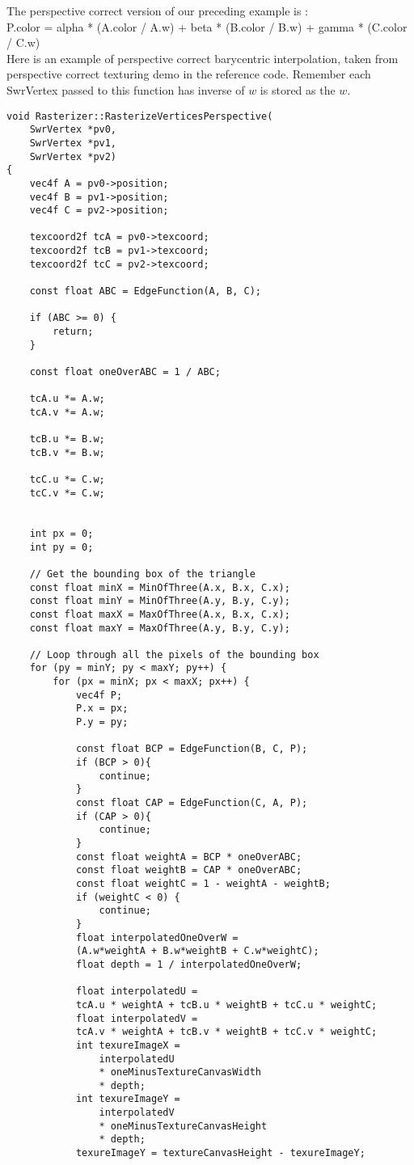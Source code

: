 The perspective correct version of our preceding example is :	\\
P.color = alpha * (A.color / A.w) + beta * (B.color / B.w) + gamma * (C.color / C.w) \\


Here is an example of perspective correct barycentric interpolation, taken from perspective correct texturing demo in the reference code.
Remember each SwrVertex passed to this function has inverse of $w$ is stored as the $w$.
\lstset{style=cpp}
\begin{lstlisting}
void Rasterizer::RasterizeVerticesPerspective(
	SwrVertex *pv0, 
	SwrVertex *pv1, 
	SwrVertex *pv2) 
{
	vec4f A = pv0->position;
	vec4f B = pv1->position;
	vec4f C = pv2->position;

	texcoord2f tcA = pv0->texcoord;
	texcoord2f tcB = pv1->texcoord;
	texcoord2f tcC = pv2->texcoord;

	const float ABC = EdgeFunction(A, B, C);
	
	if (ABC >= 0) {
		return;
	}

	const float oneOverABC = 1 / ABC;

	tcA.u *= A.w;
	tcA.v *= A.w;

	tcB.u *= B.w;
	tcB.v *= B.w;

	tcC.u *= C.w;
	tcC.v *= C.w;


	int px = 0;
	int py = 0;

	// Get the bounding box of the triangle
	const float minX = MinOfThree(A.x, B.x, C.x);
	const float minY = MinOfThree(A.y, B.y, C.y);
	const float maxX = MaxOfThree(A.x, B.x, C.x);
	const float maxY = MaxOfThree(A.y, B.y, C.y);

	// Loop through all the pixels of the bounding box
	for (py = minY; py < maxY; py++) {
		for (px = minX; px < maxX; px++) {
			vec4f P;
			P.x = px;
			P.y = py;

			const float BCP = EdgeFunction(B, C, P);
			if (BCP > 0){
				continue;
			}
			const float CAP = EdgeFunction(C, A, P);
			if (CAP > 0){
				continue;
			}
			const float weightA = BCP * oneOverABC;
			const float weightB = CAP * oneOverABC;
			const float weightC = 1 - weightA - weightB;
			if (weightC < 0) {
				continue;
			}
			float interpolatedOneOverW = 
			(A.w*weightA + B.w*weightB + C.w*weightC);
			float depth = 1 / interpolatedOneOverW;

			float interpolatedU = 
			tcA.u * weightA + tcB.u * weightB + tcC.u * weightC;
			float interpolatedV = 
			tcA.v * weightA + tcB.v * weightB + tcC.v * weightC;
			int texureImageX = 
				interpolatedU  
				* oneMinusTextureCanvasWidth 
				* depth;
			int texureImageY = 
				interpolatedV
				* oneMinusTextureCanvasHeight
				* depth;
			texureImageY = textureCanvasHeight - texureImageY;


\end{lstlisting}
